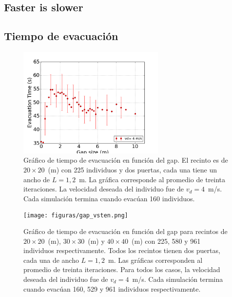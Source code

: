 \subsection{Faster is slower}

\subsection{Tiempo de evacuación}

\begin{figure}[H]
    \centering
    \includegraphics[height=5.5cm]{figuras/gap_vste_225p.png}
    \caption[width=5cm]{Gráfico de tiempo de evacuación en función del gap. El recinto es de $20\times 20$~(m) con 225 individuos y dos puertas, cada una tiene un ancho de $L=1,2$~m. La gráfica corresponde al promedio de treinta iteraciones. La velocidad deseada del individuo fue de $v_d=4$~m/s. Cada simulación termina cuando evacúan 160 individuos.}
    \label{sintesis}
\end{figure}

\begin{figure}[H]
    \centering
    \texttt{[image: figuras/gap\_vsten.png]}
    \caption[width=5cm]{Gráfico de tiempo de evacuación en función del gap para recintos de $20\times 20$~(m), $30\times 30$~(m) y $40\times 40$~(m) con 225, 580 y 961 individuos respectivamente. Todos los recintos tienen dos puertas, cada una de ancho $L=1,2$~m. Las gráficas corresponden al promedio de treinta iteraciones. Para todos los casos, la velocidad deseada del individuo fue de $v_d=4$~m/s. Cada simulación termina cuando evacúan 160, 529 y 961 individuos respectivamente.}
    \label{sintesis}
\end{figure}

